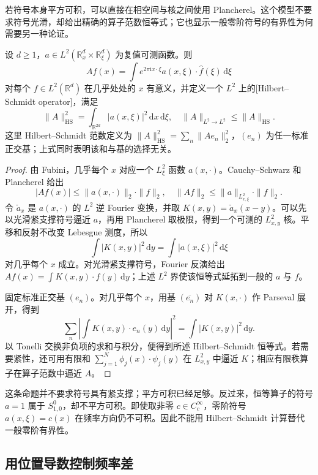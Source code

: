 若符号本身平方可积，可以直接在相空间与核之间使用 Plancherel。这个模型不要求符号光滑，却给出精确的算子范数恒等式；它也显示一般零阶符号的有界性为何需要另一种论证。

\begin{proposition}
\label{b2:prop:G-hilbert-schmidt}
设 \(d\ge1\)，\(a\in L^2(\mathbb R_x^d\times\mathbb R_\xi^d)\) 为复值可测函数。则
\[
 Af(x)=\int e^{2\pi\mathrm ix\cdot\xi}
               a(x,\xi)\cdot\widehat f(\xi)\,\mathrm d\xi
\]
对每个 \(f\in L^2(\mathbb R^d)\) 在几乎处处的 \(x\) 有意义，并定义一个 \(L^2\) 上的[Hilbert--Schmidt operator]，满足
\[
 \|A\|_{\mathrm{HS}}^2
 =\int_{\mathbb R^{2d}}|a(x,\xi)|^2\,\mathrm dx\,\mathrm d\xi,
 \quad \|A\|_{L^2\to L^2}\le\|A\|_{\mathrm{HS}}.
\]
这里 Hilbert--Schmidt 范数定义为
\(\|A\|_{\mathrm{HS}}^2=\sum_n\|Ae_n\|_2^2\)，\((e_n)\) 为任一标准正交基；上式同时表明该和与基的选择无关。
\end{proposition}
\begin{proof}
由 Fubini，几乎每个 \(x\) 对应一个 \(L^2_\xi\) 函数 \(a(x,\cdot)\)。Cauchy--Schwarz 和 Plancherel 给出
\[
 |Af(x)|\le\|a(x,\cdot)\|_2\cdot\|f\|_2,
 \quad \|Af\|_2\le\|a\|_{L^2_{x,\xi}}\cdot\|f\|_2.
\]
令 \(\check a_x\) 是 \(a(x,\cdot)\) 的 \(L^2\) 逆 Fourier 变换，并取
\(K(x,y)=\check a_x(x-y)\)。可以先以光滑紧支撑符号逼近 \(a\)，再用 Plancherel 取极限，得到一个可测的 \(L^2_{x,y}\) 核。平移和反射不改变 Lebesgue 测度，所以
\[
 \int|K(x,y)|^2\,\mathrm dy
 =\int|a(x,\xi)|^2\,\mathrm d\xi
\]
对几乎每个 \(x\) 成立。对光滑紧支撑符号，Fourier 反演给出 \(Af(x)=\int K(x,y)\cdot f(y)\,\mathrm dy\)；上述 \(L^2\) 界使该恒等式延拓到一般的 \(a\) 与 \(f\)。

固定标准正交基 \((e_n)\)。对几乎每个 \(x\)，用基 \((\overline{e_n})\) 对 \(K(x,\cdot)\) 作 Parseval 展开，得到
\[
 \sum_n\left|\int K(x,y)\cdot e_n(y)\,\mathrm dy\right|^2
 =\int|K(x,y)|^2\,\mathrm dy.
\]
以 Tonelli 交换非负项的求和与积分，便得到所述 Hilbert--Schmidt 恒等式。若需要紧性，还可用有限和 \(\sum_{j=1}^N\phi_j(x)\cdot\psi_j(y)\) 在 \(L^2_{x,y}\) 中逼近 \(K\)；相应有限秩算子在算子范数中逼近 \(A\)。
\end{proof}
这条命题并不要求符号具有紧支撑；平方可积已经足够。反过来，恒等算子的符号 \(a=1\) 属于 \(S^0_{1,0}\)，却不平方可积。即使取非零 \(c\in C_c^\infty\)，零阶符号 \(a(x,\xi)=c(x)\) 在频率方向仍不可积。因此不能用 Hilbert--Schmidt 计算替代一般零阶有界性。

\subsection{用位置导数控制频率差}
\label{b2:subsec:G0103}

